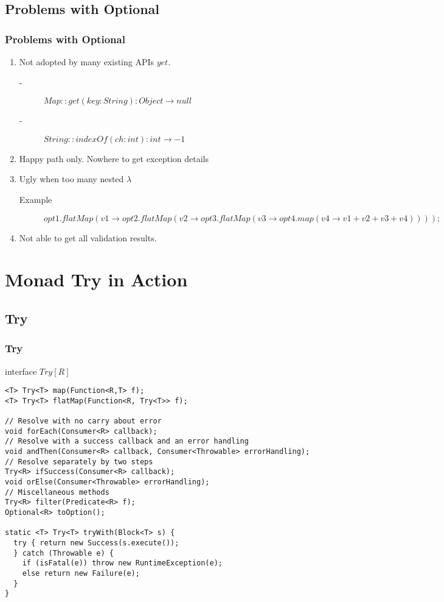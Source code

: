 \documentclass{beamer}
\begin{document}
\subsection{Problems with Optional}
\begin{frame}
  \frametitle{Problems with Optional}
    \begin{enumerate}
    \item<1-> Not adopted by many existing APIs $yet$.
      \begin{description}
      \item[-] $Map::get(key: String): Object \rightarrow null $
      \item[-] $String::indexOf(ch: int): int \rightarrow -1$
      \end{description}
    \item<2-> Happy path only. Nowhere to get exception details
    \item<3-> Ugly when too many nested \alert{$\lambda$}
        \begin{description}
        \item[Example] $opt1.flatMap(v1 \rightarrow opt2.flatMap(v2 \rightarrow opt3.flatMap(v3 \rightarrow opt4.map(v4 \rightarrow v1 + v2 + v3 + v4))));$
        \end{description}
    \item<4-> Not able to get all validation results.
    \end{enumerate}
\end{frame}
  
\section{Monad Try in Action}
\subsection{Try}
\begin{frame}[fragile]
  \frametitle{Try}
  interface $Try \left[R \right]$
  \scriptsize{
  \begin{verbatim}
<T> Try<T> map(Function<R,T> f);
<T> Try<T> flatMap(Function<R, Try<T>> f);

// Resolve with no carry about error
void forEach(Consumer<R> callback);
// Resolve with a success callback and an error handling
void andThen(Consumer<R> callback, Consumer<Throwable> errorHandling);
// Resolve separately by two steps
Try<R> ifSuccess(Consumer<R> callback);
void orElse(Consumer<Throwable> errorHandling);
// Miscellaneous methods
Try<R> filter(Predicate<R> f);
Optional<R> toOption();

static <T> Try<T> tryWith(Block<T> s) {
  try { return new Success(s.execute());
  } catch (Throwable e) {
    if (isFatal(e)) throw new RuntimeException(e);
    else return new Failure(e);
  }
}
  \end{verbatim}
  }
\end{frame}
\end{document}
